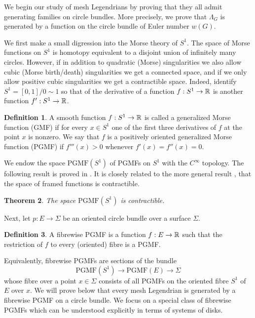 \documentclass[11pt]{article}
\numberwithin{equation}{section}\providecommand{\dpl}{\displaystyle}
\newcommand{\PGMF}{\mathrm{PGMF}}
\theoremstyle{plain}
\newtheorem{theorem}{Theorem}[section]
\theoremstyle{definition}
\newtheorem{definition}[theorem]{Definition}
\begin{document}
We begin our study of mesh Legendrians by proving that they all admit generating families on circle bundles. More precisely, we prove that $\Lambda_G$ is generated by a function on the circle bundle of Euler number $w(G)$.

We first make a small digression into the Morse theory of $S^1$. The space of Morse functions on $S^1$ is homotopy equivalent to a disjoint union of infinitely many circles. However, if in addition to quadratic (Morse) singularities we also allow cubic (Morse birth/death) singularities we get a connected space, and if we only allow positive cubic singularities we get a contractible space. Indeed, identify $S^1 = [0,1]/ 0 \sim 1$ so that of the derivative of a function $f:S^1 \to \mathbb{R}$ is another function $f':S^1 \to \mathbb{R}$.
\begin{definition}
A smooth function $f:S^1 \to \mathbb{R}$ is called a generalized Morse function (GMF) if for every $x \in S^1$ one of the first three derivatives of $f$ at the point $x$ is nonzero. We say that $f$ is a positively oriented generalized Morse function (PGMF) if $f'''(x)>0$ whenever $f'(x)=f''(x)=0$. \end{definition}

We endow the space $\PGMF(S^1)$ of PGMFs on $S^1$ with the $C^\infty$ topology. The following result is proved in \cite{IK93}. It is closely related to the more general result \cite{I87}, \cite{EM12} that the space of framed functions is contractible.

\begin{theorem}\label{contractibility}
The space $\PGMF(S^1)$ is contractible.
\end{theorem}

Next, let $p: E \to \Sigma$ be an oriented circle bundle over a surface $\Sigma$.

\begin{definition}
A fibrewise PGMF is a function $f:E \to \mathbb{R}$ such that the restriction of $f$ to every (oriented) fibre is a PGMF.
\end{definition}

Equivalently, fibrewise PGMFs are sections of the bundle
\[
\PGMF(S^1) \to \PGMF(E) \to \Sigma
\]
whose fibre over a point $x \in \Sigma$ consists of all PGMFs on the oriented fibre $S^1$ of $E$ over $x$. We will prove below that every mesh Legendrian is generated by a fibrewise PGMF on a circle bundle. We focus on a special class of fibrewise PGMFs which can be understood explicitly in terms of systems of disks.
\end{document}
